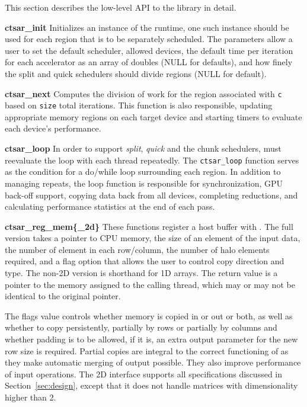 %         

This section describes the low-level API to the \tsar library in detail.

\textbf{ctsar\_init} Initializes an instance of the \tsar runtime, one such
instance should be used for each region that is to be separately scheduled.
The parameters allow a user to set the default scheduler, allowed devices, the
default time per iteration for each accelerator as an array of doubles (NULL
for defaults), and how finely the split and quick schedulers should divide
regions (NULL for default).

\textbf{ctsar\_next} Computes the division of work for the region associated
with \verb#c# based on \verb#size# total iterations.  This function is also
responsible, updating appropriate memory regions on each target device and
starting timers to evaluate each device's performance.

\textbf{ctsar\_loop} In order to support \emph{split}, \emph{quick} and the
chunk schedulers, \tsar must reevaluate the loop with each thread repeatedly.
The \verb#ctsar_loop# function serves as the condition for a do/while loop
surrounding each region. In addition to managing repeats, the loop function is
responsible for synchronization, GPU back-off support, copying data back from
all devices, completing reductions, and calculating performance statistics at
the end of each pass.

\textbf{ctsar\_reg\_mem\{\_2d\}} These functions register a host buffer with
\tsar.  The full version takes a pointer to CPU memory, the size of an element
of the input data, the number of element in each row/column, the number of
halo elements required, and a flag option that allows the user to control
copy direction and type. The non-2D version is shorthand for 1D arrays.  The
return value is a pointer to the memory assigned to the calling thread, which
may or may not be identical to the original pointer.

The flags value controls whether memory is copied in or out or both, as well
as whether to copy persistently, partially by rows or partially by columns and
whether padding is to be allowed, if it is, an extra output parameter for the
new row size is required. Partial copies are integral to the correct
functioning of \tsar as they make automatic merging of output possible. They
also improve performance of input operations. The 2D interface supports all
specifications discussed in Section~\ref{sec:design}, except that it does not
handle matrices with dimensionality higher than 2.

